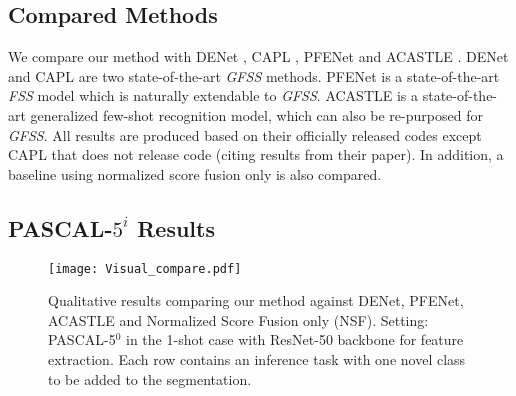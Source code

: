 \documentclass[journal]{IEEEtran}
\begin{document}
\subsection{Compared Methods}

We compare our method with DENet \cite{liu2020dynamic}, CAPL \cite{tian2020generalized}, PFENet \cite{tian2020prior} and ACASTLE \cite{ye2021learning}. 
DENet and CAPL are two state-of-the-art \textit{GFSS} methods. PFENet is a state-of-the-art \textit{FSS} model which is naturally extendable to \textit{GFSS}. 
ACASTLE is a state-of-the-art generalized few-shot recognition model, which can also be re-purposed for \textit{GFSS}. 
All results are produced based on their officially released codes except CAPL \cite{tian2020generalized} that does not release code (citing results from their paper). 
In addition, a baseline using normalized score fusion only is also compared.

\subsection{PASCAL-$5^{i}$ Results}
\begin{figure*}[ht]
    \centering
    \texttt{[image: Visual\_compare.pdf]}
\caption{Qualitative results comparing our method against DENet, PFENet, ACASTLE and Normalized Score Fusion only (NSF). Setting: PASCAL-5$^{0}$ in the 1-shot case with ResNet-50 backbone for feature extraction. Each row contains an inference task with one novel class to be added to the segmentation.}
    \label{fig:vis_com}
\end{figure*}
\end{document}
